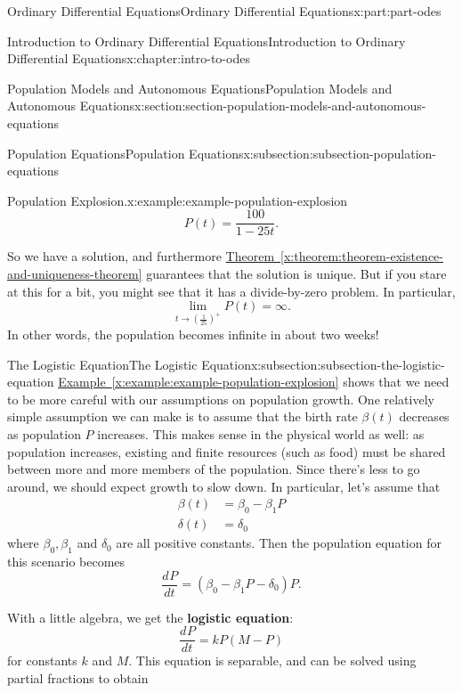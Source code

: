 \documentclass[oneside,10pt,]{book}
\newcommand{\xreffont}{\relax}
\newcommand{\terminology}[1]{\textbf{#1}}
\numberwithin{equation}{part}
\newcommand{\dv}[3][]{\dfrac{d^{#1} #2}{d #3^{#1}}}
\begin{document}
\begin{partptx}{Ordinary Differential Equations}{}{Ordinary Differential Equations}{}{}{x:part:part-odes}
\begin{chapterptx}{Introduction to Ordinary Differential Equations}{}{Introduction to Ordinary Differential Equations}{}{}{x:chapter:intro-to-odes}
\begin{sectionptx}{Population Models and Autonomous Equations}{}{Population Models and Autonomous Equations}{}{}{x:section:section-population-models-and-autonomous-equations}
\begin{subsectionptx}{Population Equations}{}{Population Equations}{}{}{x:subsection:subsection-population-equations}
\begin{example}{Population Explosion.}{x:example:example-population-explosion}
\begin{equation*}
P(t) = \frac{100}{1 - 25t}.
\end{equation*}
%
\par
So we have a solution, and furthermore \hyperref[x:theorem:theorem-existence-and-uniqueness-theorem]{Theorem~{\xreffont\ref{x:theorem:theorem-existence-and-uniqueness-theorem}}} guarantees that the solution is unique. But if you stare at this for a bit, you might see that it has a divide-by-zero problem. In particular,%
\begin{equation*}
\lim_{t\to(\frac{1}{25})^{+}}P(t) = \infty.
\end{equation*}
In other words, the population becomes infinite in about two weeks!%
\end{example}
\end{subsectionptx}
%
%
\typeout{************************************************}
\typeout{************************************************}
%
\begin{subsectionptx}{The Logistic Equation}{}{The Logistic Equation}{}{}{x:subsection:subsection-the-logistic-equation}
\hyperref[x:example:example-population-explosion]{Example~{\xreffont\ref{x:example:example-population-explosion}}} shows that we need to be more careful with our assumptions on population growth. One relatively simple assumption we can make is to assume that the birth rate \(\beta(t)\) decreases as population \(P\) increases. This makes sense in the physical world as well: as population increases, existing and finite resources (such as food) must be shared between more and more members of the population. Since there's less to go around, we should expect growth to slow down. In particular, let's assume that%
\begin{align*}
\beta(t) & = \beta_{0} - \beta_{1}P \\
\delta(t) & = \delta_{0} 
\end{align*}
where \(\beta_{0},\beta_{1}\) and \(\delta_{0}\) are all positive constants. Then the population equation for this scenario becomes%
\begin{equation*}
\dv{P}{t} = (\beta_{0} - \beta_{1}P - \delta_{0})P.
\end{equation*}
%
\par
With a little algebra, we get the \terminology{logistic equation}:%
\begin{equation*}
\dv{P}{t} = kP(M-P)
\end{equation*}
for constants \(k\) and \(M\). This equation is separable, and can be solved using partial fractions to obtain%

\end{subsectionptx}
\end{sectionptx}
\end{chapterptx}
\end{partptx}
\end{document}
